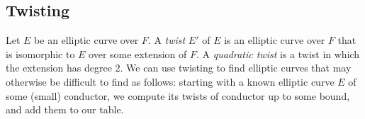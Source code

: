\documentclass{amsart}
\begin{document}


\subsection{Twisting}\label{sec:twisting}

Let $E$ be an elliptic curve over $F$. A \emph{twist} $E'$ of $E$ is an elliptic
curve over $F$ that is isomorphic to $E$ over some extension of $F$. A
\emph{quadratic twist} is a twist in which the extension has degree
$2$.  We can use twisting to find elliptic curves that may otherwise be
difficult to find as follows: starting with a known elliptic curve $E$
of some (small) conductor, we compute its twists of conductor up to
some bound, and add them to our table.
\end{document}
